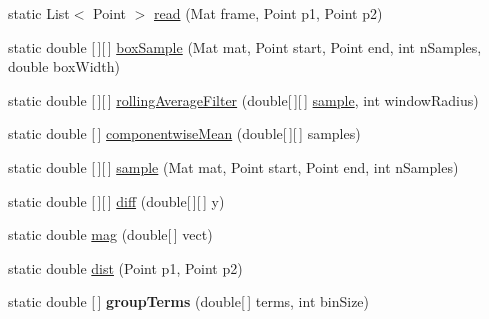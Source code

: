\begin{DoxyCompactItemize}
\item 
static List$<$ Point $>$ \hyperlink{classohm_1_1_image_processing_1_1_band_reader_a509d4c14ff8fd2816a0e6e8341fd549b}{read} (Mat frame, Point p1, Point p2)
\item 
static double \mbox{[}$\,$\mbox{]}\mbox{[}$\,$\mbox{]} \hyperlink{classohm_1_1_image_processing_1_1_band_reader_a2e83767f5674f1463cb0168df8d073fa}{box\+Sample} (Mat mat, Point start, Point end, int n\+Samples, double box\+Width)
\item 
static double \mbox{[}$\,$\mbox{]}\mbox{[}$\,$\mbox{]} \hyperlink{classohm_1_1_image_processing_1_1_band_reader_aabe4b424365cdc920b0ff8f4e7194f0f}{rolling\+Average\+Filter} (double\mbox{[}$\,$\mbox{]}\mbox{[}$\,$\mbox{]} \hyperlink{classohm_1_1_image_processing_1_1_band_reader_a19841f2d731de48d3e4b1f0b2cbe2ee8}{sample}, int window\+Radius)
\item 
static double \mbox{[}$\,$\mbox{]} \hyperlink{classohm_1_1_image_processing_1_1_band_reader_accce69c7e643760e6952c2328b79e067}{componentwise\+Mean} (double\mbox{[}$\,$\mbox{]}\mbox{[}$\,$\mbox{]} samples)
\item 
static double \mbox{[}$\,$\mbox{]}\mbox{[}$\,$\mbox{]} \hyperlink{classohm_1_1_image_processing_1_1_band_reader_a19841f2d731de48d3e4b1f0b2cbe2ee8}{sample} (Mat mat, Point start, Point end, int n\+Samples)
\item 
static double \mbox{[}$\,$\mbox{]}\mbox{[}$\,$\mbox{]} \hyperlink{classohm_1_1_image_processing_1_1_band_reader_abe546887928066f1743f775c01493110}{diff} (double\mbox{[}$\,$\mbox{]}\mbox{[}$\,$\mbox{]} y)
\item 
static double \hyperlink{classohm_1_1_image_processing_1_1_band_reader_ac2ee0b6de8f02e13da47d02c5d7a1bc8}{mag} (double\mbox{[}$\,$\mbox{]} vect)
\item 
static double \hyperlink{classohm_1_1_image_processing_1_1_band_reader_aa3ef8a552a5abc52201bd0e9f9eeb900}{dist} (Point p1, Point p2)
\item 
\hypertarget{classohm_1_1_image_processing_1_1_band_reader_abcc381a61a6a9e1fb0445599e3bb75f6}{}\label{classohm_1_1_image_processing_1_1_band_reader_abcc381a61a6a9e1fb0445599e3bb75f6} 
static double \mbox{[}$\,$\mbox{]} {\bfseries group\+Terms} (double\mbox{[}$\,$\mbox{]} terms, int bin\+Size)
\item 
\hypertarget{classohm_1_1_image_processing_1_1_band_reader_a46a858c5c6f885911d0e7ec549943141}{}\label{classohm_1_1_image_processing_1_1_band_reader_a46a858c5c6f885911d0e7ec549943141} 

\end{DoxyCompactItemize}

